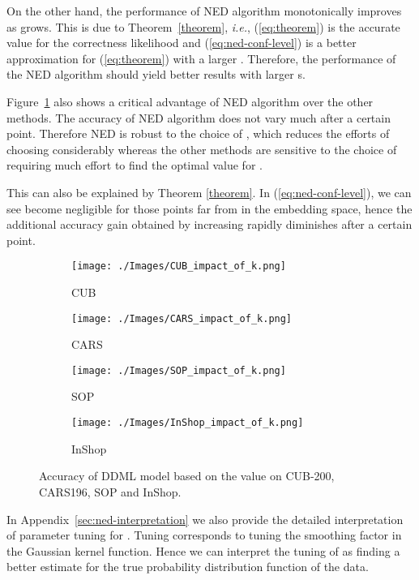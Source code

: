 \documentclass{article}
\newcommand{\ie}{{\it i.e.}}
\begin{document}
On the other hand, the performance of NED algorithm monotonically improves as  grows.
This is due to Theorem~\ref{theorem},
\ie, (\ref{eq:theorem}) is the accurate value for the correctness likelihood
and (\ref{eq:ned-conf-level}) is a better approximation for (\ref{eq:theorem}) with a larger .
Therefore, the performance of the NED algorithm should yield better results with larger s.


Figure~\ref{fig:k_preformance} also shows a critical advantage of NED algorithm over the other methods.
The accuracy of NED algorithm does not vary much after a certain point.
Therefore NED is robust to the choice of , which reduces the efforts of choosing  considerably
whereas the other methods are sensitive to the choice of  requiring much effort to find the optimal value for .

This can also be explained by Theorem \ref{theorem}.
In (\ref{eq:ned-conf-level}), we can see   become negligible for those points far from  in the embedding space,
hence the additional accuracy gain obtained by increasing  rapidly diminishes after a certain point.


\begin{figure}[h]
		\centering
	\begin{subfigure}{0.4\linewidth}
		\texttt{[image: ./Images/CUB\_impact\_of\_k.png]}
		\caption{CUB}
	\end{subfigure}\begin{subfigure}{0.4\linewidth}
		\texttt{[image: ./Images/CARS\_impact\_of\_k.png]}
		\caption{CARS}
	\end{subfigure}
	\begin{subfigure}{0.4\linewidth}
		\texttt{[image: ./Images/SOP\_impact\_of\_k.png]}
		\caption{SOP}
	\end{subfigure}
	\begin{subfigure}{0.4\linewidth}
		\texttt{[image: ./Images/InShop\_impact\_of\_k.png]}
		\caption{InShop}
	\end{subfigure}
	\caption{Accuracy of DDML model based on the  value on CUB-200, CARS196,  SOP and InShop. }
	\label{fig:k_preformance}
\end{figure}

In Appendix~\ref{sec:ned-interpretation} 
we also provide the detailed interpretation of parameter tuning for . Tuning  corresponds to tuning the smoothing factor in the Gaussian kernel function. Hence we can interpret the tuning of  as finding a better estimate for the true probability distribution function of the data.
\end{document}
